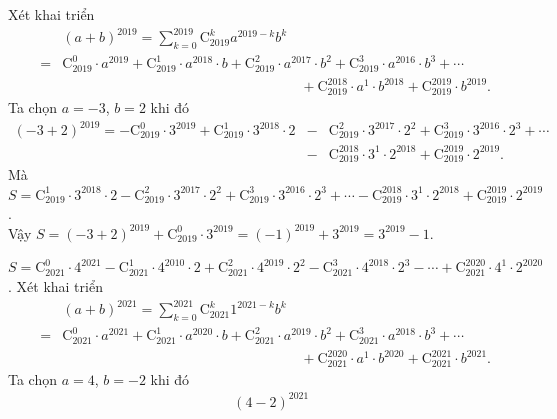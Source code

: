 \begin{bt}
{\begin{listEX}
			Xét khai triển \begin{eqnarray*}
			&&(a+b)^{2019} 
			=\displaystyle\sum\limits_{k=0}^{2019} \mathrm{C}_{2019}^k a^{2019-k} b^k\\ 
			&=&\mathrm{C}_{2019}^0 \cdot a^{2019}+\mathrm{C}_{2019}^1 \cdot a^{2018} \cdot b+\mathrm{C}_{2019}^2 \cdot a^{2017} \cdot b^2+\mathrm{C}_{2019}^3 \cdot  a^{2016} \cdot b^3+\cdots\\
			&&\quad\quad\quad\quad\quad\quad\quad\quad\quad\quad\quad\quad\quad\quad\quad\quad\quad+\mathrm{C}_{2019}^{2018} \cdot a^1 \cdot  b^{2018}+\mathrm{C}_{2019}^{2019} \cdot b^{2019}.
		\end{eqnarray*}
		Ta chọn  $a=-3$, $b=2$ khi đó
		\begin{eqnarray*}
			(-3+2)^{2019}=-\mathrm{C}_{2019}^0 \cdot 3^{2019}+\mathrm{C}_{2019}^1 \cdot 3^{2018} \cdot  2 &-&\mathrm{C}_{2019}^2 \cdot 3^{2017} \cdot 2^2
			+\mathrm{C}_{2019}^3  \cdot 3^{2016} \cdot 2^3+\cdots\\
			&-&\mathrm{C}_{2019}^{2018} \cdot 3^1 \cdot 2^{2018}+\mathrm{C}_{2019}^{2019}  \cdot 2^{2019}.
		\end{eqnarray*}
		Mà $S=\mathrm{C}_{2019}^1 \cdot 3^{2018} \cdot 2-\mathrm{C}_{2019}^2 \cdot  3^{2017} \cdot 2^2+\mathrm{C}_{2019}^3 \cdot 3^{2016} \cdot 2^3+\cdots-\mathrm{C}_{2019}^{2018} \cdot 3^1 \cdot 2^{2018}+\mathrm{C}_{2019}^{2019} \cdot 2^{2019}$.\\
		 Vậy $S=(-3+2)^{2019}+\mathrm{C}_{2019}^0 \cdot 3^{2019}=(-1)^{2019}+3^{2019}=3^{2019}-1$.
		\item $S=\mathrm{C}_{2021}^0 \cdot 4^{2021}-\mathrm{C}_{2021}^1 \cdot 4^{2010} \cdot 2+\mathrm{C}_{2021}^2 \cdot 4^{2019} \cdot 2^2-\mathrm{C}_{2021}^3 \cdot 4^{2018} \cdot 2^3-\cdots+\mathrm{C}_{2021}^{2020} \cdot 4^1 \cdot  2^{2020}$.
		Xét khai  triển
		\begin{eqnarray*}
			&&(a+b)^{2021}=\displaystyle\sum\limits_{k=0}^{2021} \mathrm{C}_{2021}^k  1^{2021-k} b^k\\
			&=&\mathrm{C}_{2021}^0 \cdot a^{2021}+\mathrm{C}_{2021}^1 \cdot a^{2020} \cdot b+\mathrm{C}_{2021}^2 \cdot a^{2019} \cdot  b^2+\mathrm{C}_{2021}^3 \cdot a^{2018} \cdot b^3+\cdots\\
			&&\quad\quad\quad\quad\quad\quad\quad\quad\quad\quad\quad\quad\quad\quad\quad\quad\quad+\mathrm{C}_{2021}^{2020} \cdot a^1  \cdot b^{2020}+\mathrm{C}_{2021}^{2021} \cdot b^{2021}.
		\end{eqnarray*}
		Ta chọn $a=4$,  $b=-2$ khi đó
		\begin{eqnarray*}
			&&(4-2)^{2021}\\ 

\end{eqnarray*}
\end{listEX}}
\end{bt}
